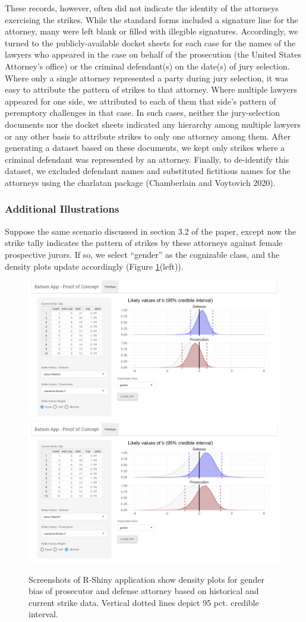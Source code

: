 \documentclass[12pt]{article}
\begin{document}
These records, however, often did not indicate the identity of the attorneys exercising the strikes. While the standard forms included a signature line for the attorney, many were left blank or filled with illegible signatures. Accordingly, we turned to the publicly-available docket sheets for each case for the names of the lawyers who appeared in the case on behalf of the prosecution (the United States Attorney's office) or the criminal defendant(s) on the date(s) of jury selection. Where only a single attorney represented a party during jury selection, it was easy to attribute the pattern of strikes to that attorney. Where multiple lawyers appeared for one side, we attributed to each of them that side's pattern of peremptory challenges in that case. In such cases, neither the jury-selection documents nor the docket sheets indicated any hierarchy among multiple lawyers or any other basis to attribute strikes to only one attorney among them. After generating a dataset based on these documents, we kept only strikes where a criminal defendant was represented by an attorney. Finally, to de-identify this dataset, we excluded defendant names and substituted fictitious names for the attorneys using the charlatan package (Chamberlain and Voytovich 2020).

\hypertarget{additional-illustrations}{%
\subsubsection{Additional Illustrations}\label{additional-illustrations}}

Suppose the same scenario discussed in section 3.2 of the paper, except now the strike tally indicates the pattern of strikes by these attorneys against female prospective jurors. If so, we select ``gender'' as the cognizable class, and the density plots update accordingly (Figure \ref{fig:figapp3}(left)).

\begin{figure}
\includegraphics[width=0.5\linewidth]{../figures/batson_app_screenshots/batson_app_screenshot3} \includegraphics[width=0.5\linewidth]{../figures/batson_app_screenshots/batson_app_screenshot4} \caption{Screenshots of R-Shiny application show density plots for gender bias of prosecutor and defense attorney based on historical and current strike data. Vertical dotted lines depict 95 pct. credible interval.}\label{fig:figapp3}
\end{figure}
\end{document}
